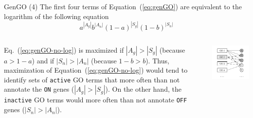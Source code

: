 \documentclass{beamer}
\begin{document}
\begin{frame}{GenGO (4)}
 The first four terms of Equation~(\ref{eq:genGO}) are equivalent to the
logarithm of the following equation
\begin{equation}
a^{|A_g|}b^{|A_n|}(1-a)^{|S_g|}(1-b)^{|S_n|}
\label{eq:genGO-no-log}
\end{equation}

\begin{columns}

\begin{scriptsize}
Eq.~(\ref{eq:genGO-no-log}) is
maximized if $|A_g|>|S_g|$ (because  $a>1-a$) and if $|S_n|>|A_n|$
(because $1-b>b$). Thus, maximization of
Equation~(\ref{eq:genGO-no-log}) would tend to identify sets of
\texttt{active} GO terms
that more often than not annotate the \texttt{ON} genes
($|A_g|>|S_g|$). On the other hand, the \texttt{inactive} GO terms
would more often than not annotate \texttt{OFF} genes
($|S_n|>|A_n|$).
\end{scriptsize}
 \includegraphics[width=1\textwidth]{./img/genGO.png}
\end{columns}


\end{frame}
\end{document}
